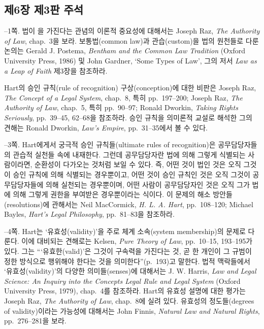 {\subsection{제6장 제3판
주석}\label{uxc81c6uxc7a5-uxc81c3uxd310-uxc8fcuxc11d}

--1쪽.  법이
을 가진다는 관념의 이론적 중요성에 대해서는 Joseph
Raz, \emph{The Authority of Law}, chap.~3을 보라. 보통법(common law)과
관습(custom)을 법의 원천들로 다룬 논의는 Gerald J. Postema,
\emph{Bentham and the Common Law Tradition} (Oxford University Press,
1986) 및 John Gardner, `Some Types of Law', 그의 저서 \emph{Law as a
Leap of Faith} 제3장을 참조하라.

Hart의 승인 규칙(rule of recognition) 구상(conception)에 대한 비판은
Joseph Raz, \emph{The Concept of a Legal System}, chap.~8, 특히
pp.~197--200; Joseph Raz, \emph{The Authority of Law}, chap.~5, 특히
pp.~90--97; Ronald Dworkin, \emph{Taking Rights Seriously}, pp.~39--45,
62--68을 참조하라. 승인 규칙을 의미론적 교설로 해석한 그의 견해는 Ronald
Dworkin, \emph{Law's Empire}, pp.~31--35에서 볼 수 있다.

--3쪽.  Hart에게서 궁극적 승인 규칙들(ultimate
rules of recognition)은 공무담당자들의 관습적 실천들 속에 내재한다.
그런데 공무담당자란 법에 의해 그렇게 식별되는 사람이라면, 순환성이
다가오는 것처럼 보일 수 있다. 즉, 어떤 것이 법인 것은 오직 그것이 승인
규칙에 의해 식별되는 경우뿐이고, 어떤 것이 승인 규칙인 것은 오직 그것이
공무담당자들에 의해 실천되는 경우뿐이며, 어떤 사람이 공무담당자인 것은
오직 그가 법에 의해 그렇게 권한을 부여받은 경우뿐이라는 식이다. 이
문제의 해소 방안들(resolutions)에 관해서는 Neil MacCormick, \emph{H. L.
A. Hart}, pp.~108--120; Michael Bayles, \emph{Hart's Legal Philosophy},
pp.~81--83을 참조하라.

--4쪽.  Hart는
‘유효성(validity)’을 주로 체계 소속(system membership)의 문제로 다룬다.
이에 대비되는 견해로는 Kelsen, \emph{Pure Theory of Law}, pp.~10--15,
193--195가 있다. 그는 “‘유효한(valid)’은 그것이 구속력을 가진다는 것,
곧 한 개인이 그 규범이 정한 방식으로 행위해야 한다는 것을
의미한다”(p.~193)고 말한다. 법적 맥락들에서 ‘유효성(validity)’의 다양한
의미들(senses)에 대해서는 J. W. Harris, \emph{Law and Legal Science: An
Inquiry into the Concepts Legal Rule and Legal System} (Oxford
University Press, 1979), chap.~4를 참조하라. Hart의 유효성 설명에 대한
평가는 Joseph Raz, \emph{The Authority of Law}, chap.~8에 실려 있다.
유효성의 정도들(degrees of validity)이라는 가능성에 대해서는 John
Finnis, \emph{Natural Law and Natural Rights}, pp.~276--281을 보라.

}
